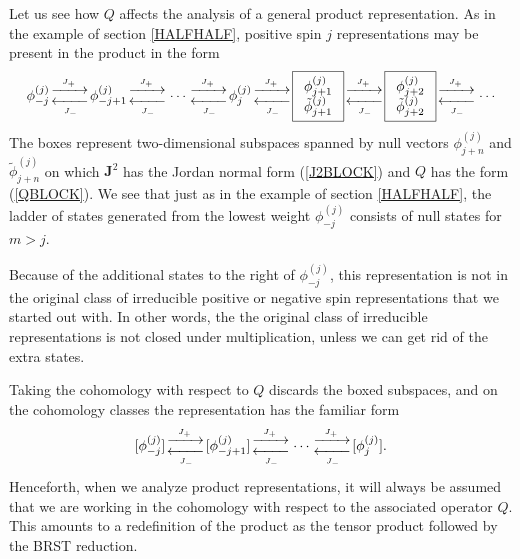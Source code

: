 \documentclass[a4paper,dvips,12pt]{article}
\newcommand {\Jpmarrow} {\genfrac{}{}{0pt}{1}{\xrightarrow{\phantom{n}J_+\phantom{n}}}
                         {\xleftarrow[\phantom{n}J_-\phantom{n}]{}}}
\begin{document}
    Let us see how $Q$ affects the analysis of a
    general product representation.  As in the example of section
    \ref{HALFHALF}, positive spin $j$ representations may be
    present in the product in the form
    \begin{equation}
        \phi_{-j}^{(j)}
        \Jpmarrow \phi_{-j+1}^{(j)}
        \Jpmarrow \cdots
        \Jpmarrow \phi_{j}^{(j)}
        \Jpmarrow
           \boxed{
            \begin{array}{c}
                \phi_{j+1}^{(j)} \\
                \tilde\phi_{j+1}^{(j)}
            \end{array}
           }
        \Jpmarrow
            \boxed{
            \begin{array}{c}
                \phi_{j+2}^{(j)} \\
                \tilde\phi_{j+2}^{(j)}
            \end{array}
           }
        \Jpmarrow
        \cdots
        \label{BADREP}
    \end{equation}
    The boxes represent two-dimensional subspaces spanned by null
    vectors $\phi_{j+n}^{(j)}$ and $\tilde\phi_{j+n}^{(j)}$ on
    which
    $\mathbf{J}^2$ has the Jordan normal form (\ref{J2BLOCK})
    and $Q$ has the form (\ref{QBLOCK}).  We see that just as in
    the example of section \ref{HALFHALF},
    the ladder of states generated from the lowest weight $\phi_{-j}^{(j)}$
    consists of null states for $m > j$.

    Because of the additional states to the right of
    $\phi_{-j}^{(j)}$, this representation is not in the
    original class of irreducible
    positive or negative spin representations that we started
    out with.  In other words, the the original class of
    irreducible representations is not closed under
    multiplication, unless we can get rid of the extra states.

    Taking the cohomology with respect to $Q$ discards
    the boxed subspaces, and on the cohomology
    classes the representation has the familiar form
    \[
        [\phi_{-j}^{(j)}]
        \Jpmarrow [\phi_{-j+1}^{(j)}]
        \Jpmarrow \cdots
        \Jpmarrow [\phi_{j}^{(j)}].
    \]
    Henceforth, when we analyze product representations, it will
    always be assumed that we are working in the cohomology with respect to the
    associated operator $Q$.  This amounts to a redefinition of
    the product as the tensor product followed by the BRST
    reduction.
\end{document}
